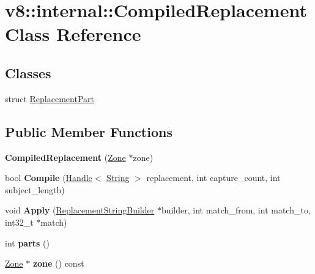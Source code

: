 \hypertarget{classv8_1_1internal_1_1_compiled_replacement}{}\section{v8\+:\+:internal\+:\+:Compiled\+Replacement Class Reference}
\label{classv8_1_1internal_1_1_compiled_replacement}
\subsection*{Classes}
\begin{DoxyCompactItemize}
\item 
struct \hyperlink{structv8_1_1internal_1_1_compiled_replacement_1_1_replacement_part}{Replacement\+Part}
\end{DoxyCompactItemize}
\subsection*{Public Member Functions}
\begin{DoxyCompactItemize}
\item 
{\bfseries Compiled\+Replacement} (\hyperlink{classv8_1_1internal_1_1_zone}{Zone} $\ast$zone)\hypertarget{classv8_1_1internal_1_1_compiled_replacement_af765df3b9de1cb70e4e76fe1852152aa}{}\label{classv8_1_1internal_1_1_compiled_replacement_af765df3b9de1cb70e4e76fe1852152aa}

\item 
bool {\bfseries Compile} (\hyperlink{classv8_1_1internal_1_1_handle}{Handle}$<$ \hyperlink{classv8_1_1internal_1_1_string}{String} $>$ replacement, int capture\+\_\+count, int subject\+\_\+length)\hypertarget{classv8_1_1internal_1_1_compiled_replacement_a6bbbb9e7adf3f4c001030aed4c1f73b5}{}\label{classv8_1_1internal_1_1_compiled_replacement_a6bbbb9e7adf3f4c001030aed4c1f73b5}

\item 
void {\bfseries Apply} (\hyperlink{classv8_1_1internal_1_1_replacement_string_builder}{Replacement\+String\+Builder} $\ast$builder, int match\+\_\+from, int match\+\_\+to, int32\+\_\+t $\ast$match)\hypertarget{classv8_1_1internal_1_1_compiled_replacement_af54fff6c76ff6a26e3d57fa97cded113}{}\label{classv8_1_1internal_1_1_compiled_replacement_af54fff6c76ff6a26e3d57fa97cded113}

\item 
int {\bfseries parts} ()\hypertarget{classv8_1_1internal_1_1_compiled_replacement_a89a5f2e577223ea684b32d007383748b}{}\label{classv8_1_1internal_1_1_compiled_replacement_a89a5f2e577223ea684b32d007383748b}

\item 
\hyperlink{classv8_1_1internal_1_1_zone}{Zone} $\ast$ {\bfseries zone} () const \hypertarget{classv8_1_1internal_1_1_compiled_replacement_ac7ab3d4e9f1d0cb3a8ed38bd9c23e8f6}{}\label{classv8_1_1internal_1_1_compiled_replacement_ac7ab3d4e9f1d0cb3a8ed38bd9c23e8f6}

\end{DoxyCompactItemize}
